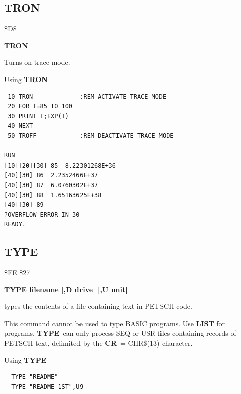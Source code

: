 
\newpage
\subsection{TRON}
\begin{description}[leftmargin=2cm,style=nextline]
\item [Token:] \$D8
\item [Format:] {\bf TRON}
\item [Usage:]  Turns on trace mode.

\item [Example:] Using {\bf TRON}
\begin{tcolorbox}[colback=black,coltext=white]
\verbatimfont{\codefont}
\begin{verbatim}
 10 TRON             :REM ACTIVATE TRACE MODE
 20 FOR I=85 TO 100
 30 PRINT I;EXP(I)
 40 NEXT
 50 TROFF            :REM DEACTIVATE TRACE MODE

RUN
[10][20][30] 85  8.22301268E+36
[40][30] 86  2.2352466E+37
[40][30] 87  6.0760302E+37
[40][30] 88  1.65163625E+38
[40][30] 89
?OVERFLOW ERROR IN 30
READY.
\end{verbatim}
\end{tcolorbox}
\end{description}


\newpage
\subsection{TYPE}
\begin{description}[leftmargin=2cm,style=nextline]
\item [Token:] \$FE \$27
\item [Format:] {\bf TYPE filename [,D drive] [,U unit] }
\item [Usage:] types the contents of a file containing
      text in PETSCII code.

   \filenamedefinition

   \drivedefinition

   \unitdefinition

\item [Remarks:] This command cannot be used to type
                 BASIC programs. Use {\bf LIST} for programs.
                 {\bf TYPE} can only process SEQ or USR files
                 containing records of PETSCII text, delimited
                 by the {\bf CR} = CHR\$(13) character.

\item [Example:] Using {\bf TYPE}
\begin{tcolorbox}[colback=black,coltext=white]
\verbatimfont{\codefont}
\begin{verbatim}
  TYPE "README"
  TYPE "README 1ST",U9
\end{verbatim}
\end{tcolorbox}
\end{description}

